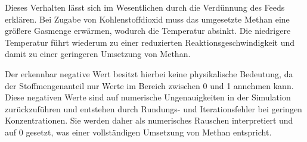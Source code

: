          Dieses Verhalten lässt sich im Wesentlichen durch die Verdünnung des Feeds erklären. Bei Zugabe von Kohlenstoffdioxid muss das umgesetzte Methan eine größere Gasmenge erwärmen, wodurch die Temperatur absinkt. Die niedrigere Temperatur führt wiederum zu einer reduzierten Reaktionsgeschwindigkeit und damit zu einer geringeren Umsetzung von Methan.

        Der erkennbar negative Wert besitzt hierbei keine physikalische Bedeutung, da der Stoffmengenanteil nur Werte im Bereich zwischen 0 und 1 annehmen kann. Diese negativen Werte sind auf numerische Ungenauigkeiten in der Simulation zurückzuführen und entstehen durch Rundungs- und Iterationsfehler bei geringen Konzentrationen. Sie werden daher als numerisches Rauschen interpretiert und auf 0 gesetzt, was einer vollständigen Umsetzung von Methan entspricht. 

